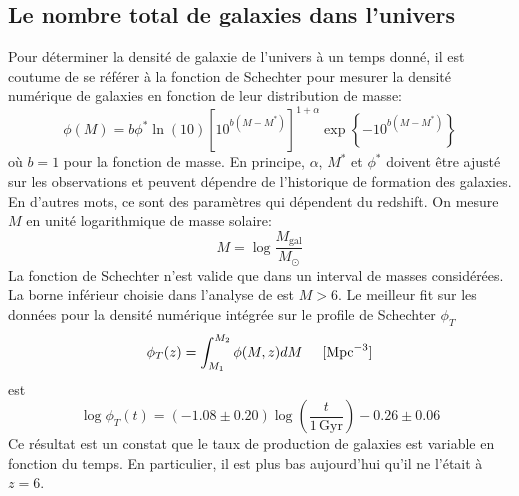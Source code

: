 \documentclass{article}
\numberwithin{equation}{section}
\begin{document}
\subsection{Le nombre total de galaxies dans l'univers}
Pour déterminer la densité de galaxie de l'univers à un temps donné, il est coutume de 
se référer à la fonction de Schechter pour mesurer la densité numérique de galaxies 
en fonction de leur distribution de masse:
\begin{equation}\label{eq:Schechter} 
        \phi(M) = b\phi^* \ln(10) \left[ 10^{b(M - M^{*})} \right]^{1 + \alpha} \exp \left\{ 
        -10^{b(M - M^{*})}\right\}
\end{equation} 
où $b=1$ pour la fonction de masse. En principe, $\alpha$, $M^{*}$ et $\phi^{*}$ doivent 
être ajusté sur les observations et peuvent dépendre de l'historique de formation 
des galaxies. En d'autres mots, ce sont des paramètres qui dépendent du redshift. On 
mesure $M$ en unité logarithmique de masse solaire:
\[
        M = \log \frac{M_{\text{gal}}}{M_\odot}
\]
La fonction de Schechter n'est valide que dans un interval de masses considérées. La borne 
inférieur choisie dans l'analyse de \cite{Conselice2016} est $M > 6$. Le meilleur fit sur les données 
pour la densité numérique intégrée sur le profile de Schechter $\phi_T$
\[
        \phi_T(z) = \int_{M_1}^{M_2} \phi(M, z) dM \hspace{0.5cm} [\text{Mpc}^{-3}]
\]
est \cite{Conselice2016}
\[
        \log \phi_T(t) = (-1.08 \pm 0.20) \log \left( \frac{t}{1\, \text{Gyr}} \right) - 0.26 \pm 0.06
\]
Ce résultat est un constat que le taux de production de galaxies est variable 
en fonction du temps. En particulier, il est plus bas aujourd'hui qu'il ne l'était 
à $z=6$.
\end{document}
